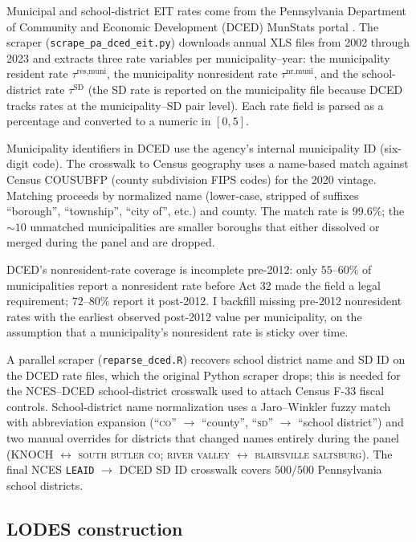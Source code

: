 \documentclass[12pt]{article}
\begin{document}
Municipal and school-district EIT rates come from the Pennsylvania
Department of Community and Economic Development (DCED) MunStats
portal \citep{padcedMunStats}. The scraper
(\texttt{scrape\_pa\_dced\_eit.py}) downloads annual XLS files from
2002 through 2023 and extracts three rate variables per municipality--year:
the municipality resident rate $\tau^{\text{res,muni}}$, the municipality
nonresident rate $\tau^{\text{nr,muni}}$, and the school-district
rate $\tau^{\text{SD}}$ (the SD rate is reported on the municipality file
because DCED tracks rates at the municipality--SD pair level). Each rate
field is parsed as a percentage and converted to a numeric in
$[0, 5]$.

Municipality identifiers in DCED use the agency's internal
municipality ID (six-digit code). The crosswalk to Census
geography uses a name-based match against Census COUSUBFP (county
subdivision FIPS codes) for the 2020 vintage. Matching proceeds by
normalized name (lower-case, stripped of suffixes ``borough'',
``township'', ``city of'', etc.) and county. The match rate is
$99.6\%$; the ${\sim}10$ unmatched municipalities are smaller boroughs that
either dissolved or merged during the panel and are dropped.

DCED's nonresident-rate coverage is incomplete pre-2012: only
$55$--$60\%$ of municipalities report a nonresident rate before Act 32 made
the field a legal requirement; $72$--$80\%$ report it post-2012. I
backfill missing pre-2012 nonresident rates with the earliest
observed post-2012 value per municipality, on the assumption that a municipality's
nonresident rate is sticky over time.

A parallel scraper (\texttt{reparse\_dced.R}) recovers school
district name and SD ID on the DCED rate files, which the
original Python scraper drops; this is needed for the NCES--DCED
school-district crosswalk used to attach Census F-33 fiscal
controls. School-district name normalization uses a Jaro--Winkler
fuzzy match with abbreviation expansion (``\textsc{co}'' $\to$
``county'', ``\textsc{sd}'' $\to$ ``school district'') and two
manual overrides for districts that changed names entirely during
the panel (\textsc{KNOCH} $\leftrightarrow$ \textsc{south butler
co}; \textsc{river valley} $\leftrightarrow$ \textsc{blairsville
saltsburg}). The final NCES \texttt{LEAID} $\to$ DCED
SD ID crosswalk covers $500/500$ Pennsylvania school
districts.

\subsection{LODES construction}
\label{app:data-lodes}
\end{document}
